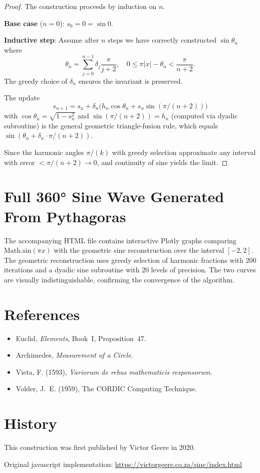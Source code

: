 \documentclass[12pt,a4paper]{article}
\begin{document}
\begin{proof}
The construction proceeds by induction on $n$.

\textbf{Base case} ($n=0$): $s_0 = 0 = \sin 0$.

\textbf{Inductive step}: Assume after $n$ steps we have correctly constructed $\sin \theta_n$ where
\[
\theta_n = \sum_{j=0}^{n-1} \delta_j \frac{\pi}{j+2}, \quad 0 \leq \pi|x| - \theta_n < \frac{\pi}{n+2}.
\]
The greedy choice of $\delta_n$ ensures the invariant is preserved.

The update
\[
s_{n+1} = s_n + \delta_n \bigl( h_n \cos\theta_n + s_n \sin(\pi/(n+2)) \bigr)
\]
with $\cos\theta_n = \sqrt{1-s_n^2}$ and $\sin(\pi/(n+2)) = h_n$ (computed via dyadic subroutine) is the general geometric triangle-fusion rule, which equals $\sin(\theta_n + \delta_n \cdot \pi/(n+2))$.

Since the harmonic angles $\pi/(k)$ with greedy selection approximate any interval with error $< \pi/(n+2) \to 0$, and continuity of sine yields the limit.
\end{proof}

\section{Full 360° Sine Wave Generated From Pythagoras}

The accompanying HTML file contains interactive Plotly graphs comparing $\mathrm{Math.sin}(\pi x)$ with the geometric sine reconstruction over the interval $[-2, 2]$. The geometric reconstruction uses greedy selection of harmonic fractions with 200 iterations and a dyadic sine subroutine with 20 levels of precision. The two curves are visually indistinguishable, confirming the convergence of the algorithm.

\section{References}

\begin{itemize}
  \item Euclid, \textit{Elements}, Book~I, Proposition~47.
  \item Archimedes, \textit{Measurement of a Circle}.
  \item Vieta, F. (1593), \textit{Variorum de rebus mathematicis responsorum}.
  \item Volder, J.~E. (1959), The CORDIC Computing Technique.
\end{itemize}

\section{History}

This construction was first published by Victor Geere in 2020.

Original javascript implementation: \url{https://victorgeere.co.za/sine/index.html}
\end{document}

